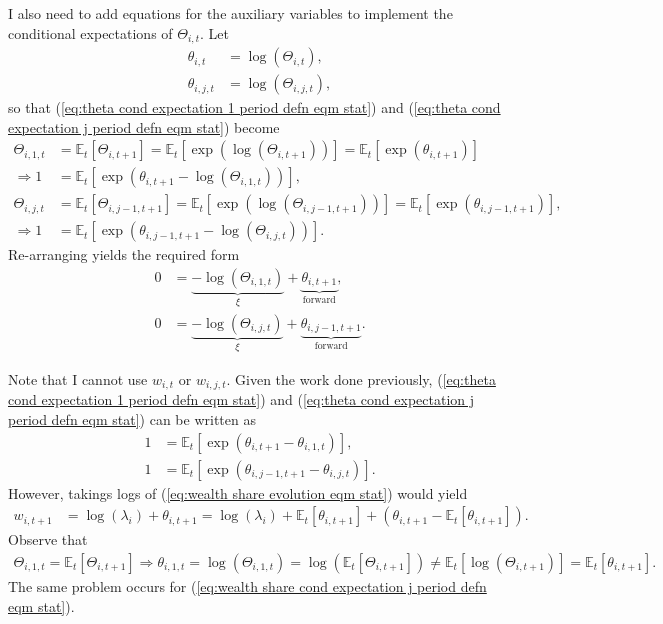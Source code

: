 \documentclass[12 pt, oneside]{article}
\theoremstyle{definition}
\theoremstyle{definition}
\theoremstyle{definition}
\newcommand{\E}{\mathbb{E}}
\begin{document}
I also need to add equations for the auxiliary variables to implement the conditional expectations of $\Theta_{i, t}$. Let
\begin{align}
\theta_{i, t} & = \log(\Theta_{i, t}),\\
\theta_{i, j, t} & = \log(\Theta_{i, j, t}),
\end{align}
so that (\ref{eq:theta cond expectation 1 period defn eqm stat}) and (\ref{eq:theta cond expectation j period defn eqm stat}) become
\begin{align*}
  \Theta_{i, 1, t} & = \E_t\left[\Theta_{i, t + 1}\right] = \E_t\left[\exp(\log(\Theta_{i, t + 1}))\right] = \E_t[\exp(\theta_{i, t + 1})]\\
  \Rightarrow 1 & = \E_t\left[\exp\left(\theta_{i, t + 1} - \log(\Theta_{i, 1, t})\right)\right],\\
  \Theta_{i, j, t} & = \E_t\left[\Theta_{i, j - 1, t + 1}\right] = \E_t\left[\exp(\log(\Theta_{i, j - 1, t + 1}))\right] = \E_t[\exp(\theta_{i, j - 1, t + 1})],\\
  \Rightarrow 1 & = \E_t\left[\exp\left(\theta_{i, j - 1, t + 1} - \log(\Theta_{i, j, t})\right)\right].
\end{align*}
Re-arranging yields the required form
\begin{align*}
  0 & = \underbrace{-\log(\Theta_{i, 1, t})}_{\xi} + \underbrace{\theta_{i, t + 1}}_{\text{forward}},\\
  0 & = \underbrace{-\log(\Theta_{i, j, t})}_{\xi} + \underbrace{\theta_{i, j - 1, t + 1}}_{\text{forward}}.
\end{align*}

Note that I cannot use $w_{i, t}$ or $w_{i, j, t}$.
Given the work done previously, (\ref{eq:theta cond expectation 1 period defn eqm stat}) and (\ref{eq:theta cond expectation j period defn eqm stat}) can be written as
\begin{align*}
  1 & = \E_t[\exp(\theta_{i, t + 1} - \theta_{i, 1, t})],\\
  1 & = \E_t[\exp(\theta_{i, j - 1, t + 1} - \theta_{i, j, t})].
\end{align*}
However, takings logs of  (\ref{eq:wealth share evolution eqm stat}) would yield
\begin{align*}
  w_{i, t + 1} & = \log(\lambda_i) + \theta_{i, t + 1} = \log(\lambda_i) + \E_t[\theta_{i, t + 1}] + (\theta_{i, t + 1} - \E_t[\theta_{i, t + 1}]).
\end{align*}
Observe that
\begin{align*}
  \Theta_{i, 1, t} = \E_t[\Theta_{i, t + 1}] \Rightarrow \theta_{i, 1, t} = \log(\Theta_{i, 1, t}) = \log(\E_t[\Theta_{i, t + 1}]) \neq \E_t[\log(\Theta_{i, t + 1})] = \E_t[\theta_{i, t + 1}].
\end{align*}
The same problem occurs for (\ref{eq:wealth share cond expectation j period defn eqm stat}).
\end{document}
